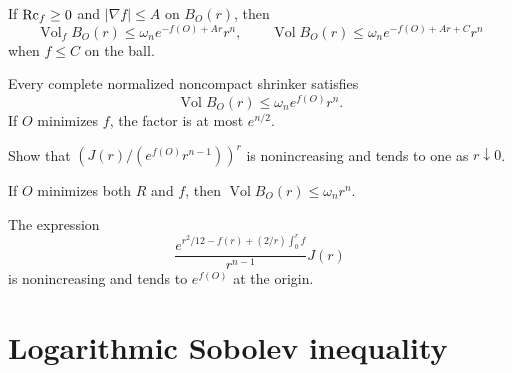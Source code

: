 \begin{theorem}
\label{thm:chow-iv-bakry-emery-comparison}
If $\operatorname{Rc}_f\ge0$ and $|\nabla f|\le A$ on $B_O(r)$, then
\[
\operatorname{Vol}_fB_O(r)\le\omega_n e^{-f(O)+Ar}r^n,
\qquad
\operatorname{Vol}B_O(r)\le\omega_ne^{-f(O)+Ar+C}r^n
\]
when $f\le C$ on the ball.
\end{theorem}

\begin{theorem}
\label{thm:chow-iv-euclidean-volume-growth}
Every complete normalized noncompact shrinker satisfies
\[
\operatorname{Vol}B_O(r)\le\omega_ne^{f(O)}r^n.
\]
If $O$ minimizes $f$, the factor is at most $e^{n/2}$.
\end{theorem}

\begin{claim}
\label{ex:chow-iv-radial-density-monotone}
Show that $\left(J(r)/(e^{f(O)}r^{n-1})\right)^r$ is nonincreasing and tends to
one as $r\downarrow0$.
\end{claim}

\begin{remark}
\label{rem:chow-iv-volume-at-scalar-minimum}
If $O$ minimizes both $R$ and $f$, then $\operatorname{Vol}B_O(r)\le\omega_nr^n$.
\end{remark}

\begin{claim}
\label{ex:chow-iv-second-radial-density}
The expression
\[
\frac{e^{r^2/12-f(r)+(2/r)\int_0^rf}}{r^{n-1}}J(r)
\]
is nonincreasing and tends to $e^{f(O)}$ at the origin.
\end{claim}

\section{Logarithmic Sobolev inequality}

